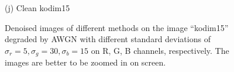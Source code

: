 \documentclass[10pt,onecolumn,letterpaper]{article}
\begin{document}
\begin{figure}
{\begin{minipage}[t]{0.195\textwidth}
{\footnotesize (j) Clean kodim15}
\end{minipage}
}
\caption{Denoised images of different methods on the image ``kodim15'' degraded by AWGN with different standard deviations of $\sigma_{r}=5, \sigma_{g}=30, \sigma_{b}=15$ on R, G, B channels, respectively. The images are better to be zoomed in on screen.}
\label{f1}
\vspace{2mm}
\end{figure}

\begin{figure}\vspace{1mm}
\centering
{}
\end{figure}
\end{document}
